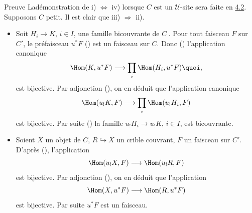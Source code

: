\documentclass[10pt]{../fichiers-configuration-latex/smfart}
\begin{document}
\begin{enonce*}[remark]{Preuve}
La\pageoriginale démonstration de i) $\Leftrightarrow$ iv)
lorsque $C$ est un $𝒰$-site sera faite en
\hyperref[III.subsec4.2]{4.2}. Supposons $C$ petit. Il est clair que iii)
$\Rightarrow$ ii).
\begin{itemize}
\item[i) $\Rightarrow$ iii):] Soit $H_i\rightarrow K$, $i\in I$, une
  famille bicouvrante de $C^{\widehat{\phantom{,}}}$. Pour tout
  faisceau $F$ sur $C'$, le préfaisceau $u^\ast F$ () est un
  faisceau sur $C$. Donc () l'application canonique
$$
\Hom(K, u^\ast F)\longrightarrow \prod_i \Hom(H_i, u^\ast F){\quoi},
$$
est bijective. Par adjonction (), on en déduit que
l'application canonique
$$
\Hom(u_{!}K,F)\longrightarrow \prod_i \Hom(u_{!}H_i, F)
$$
est bijective. Par suite () la famille
$u_{!}H_i\rightarrow u_{!}K$, $i\in I$, est bicouvrante.

\item[ii) $\Rightarrow$ i):] Soient $X$ un objet de $C$,
  $R\hookrightarrow X$ un crible couvrant, $F$ un faisceau sur
  $C'$. D'après (), l'application
$$
\Hom(u_{!}X,F)\longrightarrow \Hom(u_{!}R,F)
$$
est bijective. Par adjonction (), on en déduit que
l'application
$$
\Hom(X,u^\ast F)\longrightarrow \Hom(R, u^\ast F)
$$
est bijective. Par suite $u^\ast F$ est un faisceau.


\end{itemize}
\end{enonce*}
\end{document}
